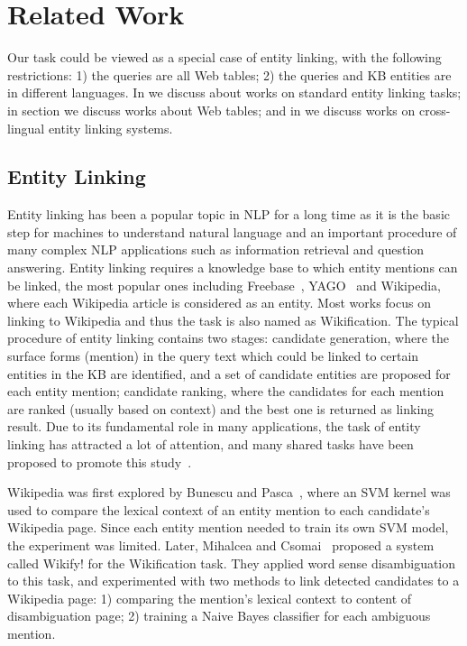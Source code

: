\section{Related Work}
Our task could be viewed as a special case of entity linking, with the following restrictions: 1) the queries are all Web tables; 2) the queries and KB entities are in different languages. In  we discuss about works on standard entity linking tasks; in section  we discuss works about Web tables; and in  we discuss works on cross-lingual entity linking systems.

\subsection{Entity Linking}
\label{sec:el}
Entity linking has been a popular topic in NLP for a long time as it is the basic step for machines to understand natural language and an important procedure of many complex NLP applications such as information retrieval and question answering. Entity linking requires a knowledge base to which entity mentions can be linked, the most popular ones including Freebase~\cite{bollacker2008freebase}, YAGO~\cite{suchanek2007yago} and Wikipedia, where each Wikipedia article is considered as an entity. Most works focus on linking to Wikipedia and thus the task is also named as Wikification. The typical procedure of entity linking contains two stages: candidate generation, where the surface forms (mention) in the query text which could be linked to certain entities in the KB are identified, and a set of candidate entities are proposed for each entity mention; candidate ranking, where the candidates for each mention are ranked (usually based on context) and the best one is returned as linking result. Due to its fundamental role in many applications, the task of entity linking has attracted a lot of attention, and many shared tasks have been proposed to promote this study~\cite{ji2010overview, cano2014microposts2014, carmel2014erd}.

Wikipedia was first explored by Bunescu and Pasca~\cite{pasca2006using}, where an SVM kernel was used to compare the lexical context of an entity mention to each candidate's Wikipedia page. Since each entity mention needed to train its own SVM model, the experiment was limited. Later, Mihalcea and Csomai~\cite{mihalcea2007wikify!:} proposed a system called Wikify! for the Wikification task. They applied word sense disambiguation to this task, and experimented with two methods to link detected candidates to a Wikipedia page: 1) comparing the mention's lexical context to content of disambiguation page; 2) training a Naive Bayes classifier for each ambiguous mention. 

